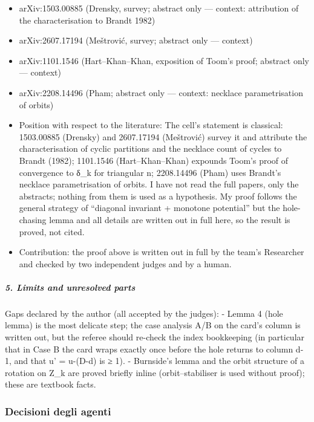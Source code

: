 \documentclass[11pt,a4paper]{article}
\providecommand{\tightlist}{\setlength{\itemsep}{0pt}\setlength{\parskip}{0pt}}
\begin{document}
\begin{itemize}
\tightlist
\item
  arXiv:1503.00885 (Drensky, survey; abstract only --- context:
  attribution of the characterisation to Brandt 1982)
\item
  arXiv:2607.17194 (Meštrović, survey; abstract only --- context)
\item
  arXiv:1101.1546 (Hart--Khan--Khan, exposition of Toom's proof;
  abstract only --- context)
\item
  arXiv:2208.14496 (Pham; abstract only --- context: necklace
  parametrisation of orbits)
\item
  Position with respect to the literature: The cell's statement is
  classical: 1503.00885 (Drensky) and 2607.17194 (Meštrović) survey it
  and attribute the characterisation of cyclic partitions and the
  necklace count of cycles to Brandt (1982); 1101.1546
  (Hart--Khan--Khan) expounds Toom's proof of convergence to δ\_k for
  triangular n; 2208.14496 (Pham) uses Brandt's necklace parametrisation
  of orbits. I have not read the full papers, only the abstracts;
  nothing from them is used as a hypothesis. My proof follows the
  general strategy of ``diagonal invariant + monotone potential'' but
  the hole-chasing lemma and all details are written out in full here,
  so the result is proved, not cited.
\item
  Contribution: the proof above is written out in full by the team's
  Researcher and checked by two independent judges and by a human.
\end{itemize}

\subparagraph{5. Limits and unresolved
parts}\label{limits-and-unresolved-parts}

Gaps declared by the author (all accepted by the judges): - Lemma 4
(hole lemma) is the most delicate step; the case analysis A/B on the
card's column is written out, but the referee should re-check the index
bookkeeping (in particular that in Case B the card wraps exactly once
before the hole returns to column d-1, and that u' = u-(D-d) is ≥ 1). -
Burnside's lemma and the orbit structure of a rotation on Z\_k are
proved briefly inline (orbit--stabiliser is used without proof); these
are textbook facts.

\subsubsection{Decisioni degli agenti}
\end{document}
